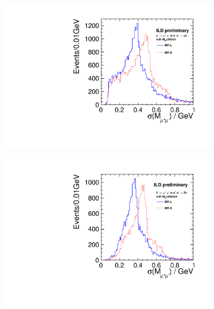 \begin{figure}[htbp]
\begin{subfigure}{0.475\hsize} 
\includegraphics[width=\textwidth]{Performance/fig/lepton_pair_inm_sigma_nh20.pdf}
 \caption{ \label{fig:extraH:Msigma:mh20}}
 \end{subfigure}
\begin{subfigure}{0.475\hsize} 
\includegraphics[width=\textwidth]{Performance/fig/lepton_pair_inm_sigma_nh100.pdf}
 \caption{  \label{fig:extraH:Msigma:mh100}}
 \end{subfigure}
\begin{subfigure}{0.475\hsize} 

\end{subfigure}
\end{figure}
